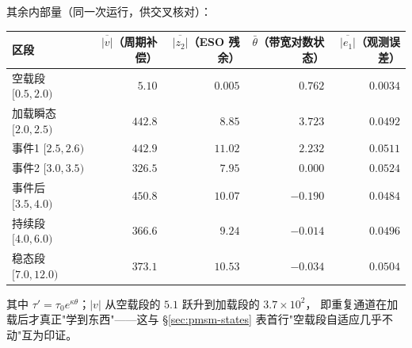 \documentclass[11pt]{article}
\theoremstyle{remark}\newtheorem{remark}{注}
\begin{document}
其余内部量（同一次运行，供交叉核对）：
\begin{center}
\footnotesize
\begin{tabular}{@{}lrrrr@{}}
\toprule
区段 & $\overline{|v|}$（周期补偿） & $\overline{|z_2|}$（ESO 残余） & $\bar\theta$（带宽对数状态） & $\overline{|e_1|}$（观测误差）\\
\midrule
空载段 $[0.5,2.0)$ & $5.10$ & $0.005$ & $0.762$ & $0.0034$\\
加载瞬态 $[2.0,2.5)$ & $442.8$ & $8.85$ & $3.723$ & $0.0492$\\
事件1 $[2.5,2.6)$ & $442.9$ & $11.02$ & $2.232$ & $0.0511$\\
事件2 $[3.0,3.5)$ & $326.5$ & $7.95$ & $0.000$ & $0.0524$\\
事件后 $[3.5,4.0)$ & $450.8$ & $10.07$ & $-0.190$ & $0.0484$\\
持续段 $[4.0,6.0)$ & $366.6$ & $9.24$ & $-0.014$ & $0.0496$\\
稳态段 $[7.0,12.0)$ & $373.1$ & $10.53$ & $-0.034$ & $0.0504$\\
\bottomrule
\end{tabular}
\end{center}
其中 $\tau'=\tau_0e^{\kappa\theta}$；$|v|$ 从空载段的 $5.1$ 跃升到加载段的 $3.7\times10^2$，
即重复通道在加载后才真正"学到东西"——这与 §\ref{sec:pmsm-states} 表首行"空载段自适应几乎不动"互为印证。
\end{document}
